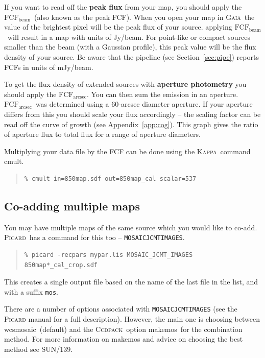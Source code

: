 \documentclass[twoside,11pt]{article}
\newcommand{\htmlref}[2]{#1}
\newcommand{\latexhtml}[2]{#1}
\newcommand{\xref}[3]{#1}
\newcommand{\xlabel}[1]{}
\renewcommand{\_}{\texttt{\symbol{95}}}
\newenvironment{myquote}{\begin{quote}\begin{small}}{\end{small}\end{quote}}
\newcommand{\fcfb}{$\mathrm{FCF_{beam}}$}
\newcommand{\fcfa}{$\mathrm{FCF_{arcsec}}$}
\newcommand{\ccdpack}{\xref{\textsc{Ccdpack}}{sun139}{}}
\newcommand{\gaia}{\xref{\textsc{Gaia}}{sun214}{}}
\newcommand{\Kappa}{\xref{\textsc{Kappa}}{sun95}{}}
\newcommand{\picard}{\xref{\textsc{Picard}}{sun265}{}}
\newcommand{\task}[1]{\textsf{#1}}
\newcommand{\param}[1]{\texttt{#1}}
\newcommand{\cmult}{\xref{\task{cmult}}{sun95}{CMULT}}
\newcommand{\wcsmosaic}{\xref{\task{wcsmosaic}}{sun95}{WCSMOSAIC}}
\newcommand{\makemos}{\xref{\task{makemos}}{sun139}{MAKEMOS}}
\newcommand{\cref}[3]{\latexhtml{#1~\ref{#2}}{\htmlref{#3}{#2}}}
\begin{document}
If you want to read off the \textbf{peak flux} from your map, you
should apply the \fcfb\ (also known as the peak FCF). When you open
your map in \gaia\ the value of the brightest pixel will be the peak
flux of your source. applying \fcfb\ will result in a map with units
of Jy/beam. For point-like or compact sources smaller than the beam
(with a Gaussian profile), this peak value will be the flux density of
your source. Be aware that the pipeline (see
\cref{Section}{sec:pipe}{SCUBA-2 Pipeline}) reports FCFs in units of mJy/beam.

To get the flux density of extended sources with \textbf{aperture
photometry} you should apply the \fcfa.  You can then sum the emission
in an aperture. \fcfa\ was determined using a 60-arcsec diameter
aperture. If your aperture differs from this you should scale your
flux accordingly -- the scaling factor can be read off the curve of
growth (see \cref{Appendix}{app:cog}{this appendix}). This graph gives
the ratio of aperture flux to total flux for a range of aperture diameters.

Multiplying your data file by the FCF can be done using the \Kappa\
command \cmult.
\begin{myquote}
\begin{verbatim}
% cmult in=850map.sdf out=850map_cal scalar=537
\end{verbatim}
\end{myquote}


\subsection{\xlabel{coadd}Co-adding multiple maps}
\label{sec:coadd}

You may have multiple maps of the same source which you would like to
co-add. \picard\ has a command for this too --
\param{MOSAIC\_JCMT\_IMAGES}.
\begin{myquote}
\begin{verbatim}
% picard -recpars mypar.lis MOSAIC_JCMT_IMAGES 850map*_cal_crop.sdf
\end{verbatim}
\end{myquote}
This creates a single output file based on the name of the last file
in the list, and with a suffix \texttt{\_mos}.

There are a number of options associated with
\param{MOSAIC\_JCMT\_IMAGES} (see the \textsc{Picard} manual for a full
description). However, the main one is choosing between \wcsmosaic\
(default) and the \ccdpack\ option \makemos\ for the combination
method. For more information on \task{makemos} and advice on choosing the
best method see SUN/139.
\end{document}
